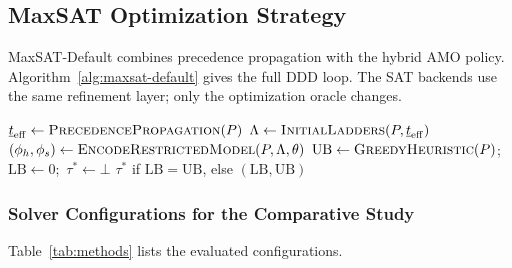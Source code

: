 \documentclass[runningheads]{llncs}
\begin{document}
\subsection{MaxSAT Optimization Strategy}

MaxSAT-Default combines precedence propagation with the hybrid AMO policy.
Algorithm~\ref{alg:maxsat-default} gives the full DDD loop. The SAT backends
use the same refinement layer; only the optimization oracle changes.

\begin{algorithm}[H]
\caption{MaxSAT-Default DDD for Train Rescheduling}
\label{alg:maxsat-default}
\footnotesize
{}
$\underline t_{\mathrm{eff}} \gets \textsc{PrecedencePropagation}(P)$\;
$\Lambda \gets \textsc{InitialLadders}(P,\underline t_{\mathrm{eff}})$\;
$(\phi_h,\phi_s) \gets \textsc{EncodeRestrictedModel}(P,\Lambda,\theta)$\;
$\mathrm{UB} \gets \textsc{GreedyHeuristic}(P)$;\ $\mathrm{LB}\gets0$;\ $\tau^*\gets\bot$\;
\Return $\tau^*$ if $\mathrm{LB}=\mathrm{UB}$, else $(\mathrm{LB},\mathrm{UB})$\;
\end{algorithm}

\subsubsection{Solver Configurations for the Comparative Study}
Table~\ref{tab:methods} lists the evaluated configurations.
\end{document}
